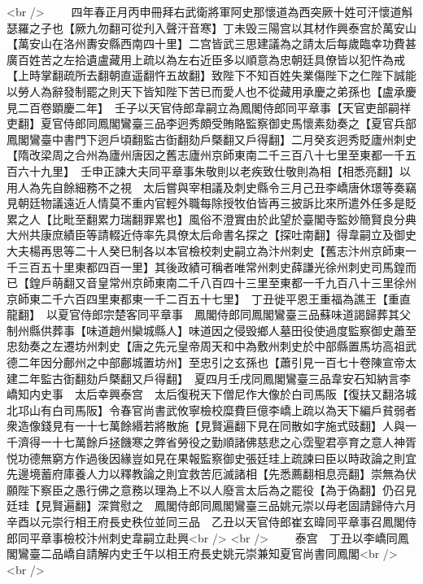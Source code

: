 <br />
　　四年春正月丙申冊拜右武衛將軍阿史那懷道為西突厥十姓可汗懷道斛瑟羅之子也【厥九勿翻可從刋入聲汗音寒】丁未毁三陽宫以其材作興泰宫於萬安山【萬安山在洛州夀安縣西南四十里】二宫皆武三思建議為之請太后每歲臨幸功費甚廣百姓苦之左拾遺盧藏用上疏以為左右近臣多以順意為忠朝廷具僚皆以犯忤為戒【上時掌翻疏所去翻朝直遥翻忤五故翻】致陛下不知百姓失業傷陛下之仁陛下誠能以勞人為辭發制罷之則天下皆知陛下苦已而愛人也不從藏用承慶之弟孫也【盧承慶見二百卷顕慶二年】　壬子以天官侍郎韋嗣立為鳳閣侍郎同平章事【天官吏部嗣祥吏翻】夏官侍郎同鳳閣鸞臺三品李迥秀頗受賄賂監察御史馬懷素劾奏之【夏官兵部鳳閣鸞臺中書門下迥戶頃翻監古衘翻劾戶槩翻又戶得翻】二月癸亥迥秀貶廬州刺史【隋改梁周之合州為廬州唐因之舊志廬州京師東南二千三百八十七里至東都一千五百六十九里】　壬申正諫大夫同平章事朱敬則以老疾致仕敬則為相【相悉亮翻】以用人為先自餘細務不之視　太后嘗與宰相議及刺史縣令三月己丑李嶠唐休璟等奏竊見朝廷物議遠近人情莫不重内官輕外職每除授牧伯皆再三披訴比來所遣外任多是貶累之人【比毗至翻累力瑞翻罪累也】風俗不澄實由於此望於臺閣寺監妙簡賢良分典大州共康庶績臣等請輟近侍率先具僚太后命書名探之【探吐南翻】得韋嗣立及御史大夫楊再思等二十人癸巳制各以本官檢校刺史嗣立為汴州刺史【舊志汴州京師東一千三百五十里東都四百一里】其後政績可稱者唯常州刺史薛謙光徐州刺史司馬鍠而已【鍠戶萌翻又音皇常州京師東南二千八百四十三里至東都一千九百八十三里徐州京師東二千六百四里東都東一千二百五十七里】　丁丑徙平恩王重福為譙王【重直龍翻】　以夏官侍郎宗楚客同平章事　鳳閣侍郎同鳳閣鸞臺三品蘇味道謁歸葬其父制州縣供葬事【味道趙州欒城縣人】味道因之侵毁鄉人墓田役使過度監察御史蕭至忠劾奏之左遷坊州刺史【唐之先元皇帝周天和中為敷州刺史於中部縣置馬坊高祖武德二年因分鄜州之中部鄜城置坊州】至忠引之玄孫也【蕭引見一百七十卷陳宣帝太建二年監古衘翻劾戶槩翻又戶得翻】　夏四月壬戌同鳳閣鸞臺三品韋安石知納言李嶠知内史事　太后幸興泰宫　太后復税天下僧尼作大像於白司馬阪【復扶又翻洛城北邛山有白司馬阪】令春官尚書武攸寧檢校糜費巨億李嶠上疏以為天下編戶貧弱者衆造像錢見有一十七萬餘緡若將散施【見賢遍翻下見在同散如字施式豉翻】人與一千濟得一十七萬餘戶拯饑寒之弊省勞役之勤順諸佛慈悲之心霑聖君亭育之意人神胥悦功德無窮方作過後因緣豈如見在果報監察御史張廷珪上疏諫曰臣以時政論之則宜先邊境蓄府庫養人力以釋教論之則宜救苦厄滅諸相【先悉薦翻相息亮翻】崇無為伏願陛下察臣之愚行佛之意務以理為上不以人廢言太后為之罷役【為于偽翻】仍召見廷珪【見賢遍翻】深賞慰之　鳳閣侍郎同鳳閣鸞臺三品姚元崇以母老固請歸侍六月辛酉以元崇行相王府長史秩位並同三品　乙丑以天官侍郎崔玄暐同平章事召鳳閣侍郎同平章事檢校汴州刺史韋嗣立赴興<br />
<br />
　　泰宫　丁丑以李嶠同鳳閣鸞臺二品嶠自請解内史壬午以相王府長史姚元崇兼知夏官尚書同鳳閣<br />
<br />
